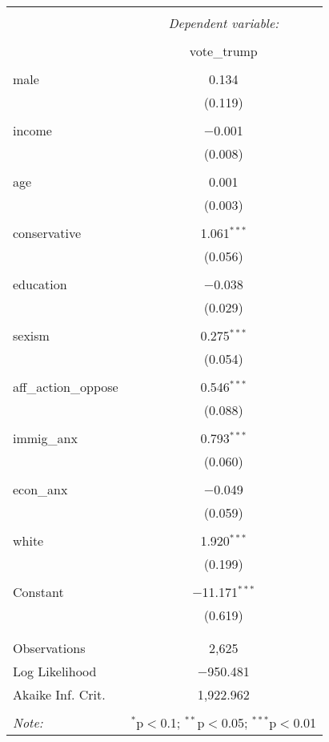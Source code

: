 
\begin{table}[!htbp] \centering 
  \caption{} 
  \label{} 
\begin{tabular}{@{\extracolsep{5pt}}lc} 
\\[-1.8ex]\hline 
\hline \\[-1.8ex] 
 & \multicolumn{1}{c}{\textit{Dependent variable:}} \\ 
\cline{2-2} 
\\[-1.8ex] & vote\_trump \\ 
\hline \\[-1.8ex] 
 male & 0.134 \\ 
  & (0.119) \\ 
  & \\ 
 income & $-$0.001 \\ 
  & (0.008) \\ 
  & \\ 
 age & 0.001 \\ 
  & (0.003) \\ 
  & \\ 
 conservative & 1.061$^{***}$ \\ 
  & (0.056) \\ 
  & \\ 
 education & $-$0.038 \\ 
  & (0.029) \\ 
  & \\ 
 sexism & 0.275$^{***}$ \\ 
  & (0.054) \\ 
  & \\ 
 aff\_action\_oppose & 0.546$^{***}$ \\ 
  & (0.088) \\ 
  & \\ 
 immig\_anx & 0.793$^{***}$ \\ 
  & (0.060) \\ 
  & \\ 
 econ\_anx & $-$0.049 \\ 
  & (0.059) \\ 
  & \\ 
 white & 1.920$^{***}$ \\ 
  & (0.199) \\ 
  & \\ 
 Constant & $-$11.171$^{***}$ \\ 
  & (0.619) \\ 
  & \\ 
\hline \\[-1.8ex] 
Observations & 2,625 \\ 
Log Likelihood & $-$950.481 \\ 
Akaike Inf. Crit. & 1,922.962 \\ 
\hline 
\hline \\[-1.8ex] 
\textit{Note:}  & \multicolumn{1}{r}{$^{*}$p$<$0.1; $^{**}$p$<$0.05; $^{***}$p$<$0.01} \\ 
\end{tabular} 
\end{table} 
